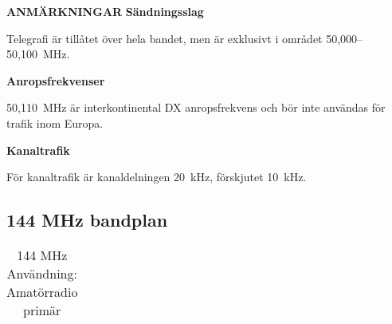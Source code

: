 \textbf{ANMÄRKNINGAR}
\textbf{Sändningsslag}

Telegrafi är tillåtet över hela bandet, men är exklusivt i området
50,000--50,100~MHz.

\textbf{Anropsfrekvenser}

50,110~MHz är interkontinental DX anropsfrekvens och bör inte användas för
trafik inom Europa.

\textbf{Kanaltrafik}

För kanaltrafik är kanaldelningen 20~kHz, förskjutet 10~kHz.

\subsection{144 MHz bandplan}

\setlongtables
\begin{longtable}{llll}
\caption{144 MHz Användning: Amatörradio primär} \\


\end{longtable}
